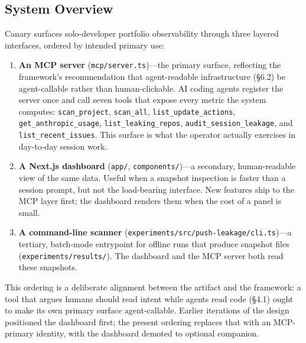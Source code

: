 \documentclass[sigconf, nonacm, anonymous=false]{acmart}
\begin{document}
\subsection{System Overview}

Canary surfaces solo-developer portfolio observability through three layered interfaces, ordered by intended primary use:

\begin{enumerate}
  \item \textbf{An MCP server} (\texttt{mcp/server.ts})---the primary surface, reflecting the framework's recommendation that agent-readable infrastructure (\S6.2) be agent-callable rather than human-clickable. AI coding agents register the server once and call seven tools that expose every metric the system computes: \texttt{scan\_project}, \texttt{scan\_all}, \texttt{list\_update\_actions}, \texttt{get\_anthropic\_usage}, \texttt{list\_leaking\_repos}, \texttt{audit\_session\_leakage}, and \texttt{list\_recent\_issues}. This surface is what the operator actually exercises in day-to-day session work.
  \item \textbf{A Next.js dashboard} (\texttt{app/}, \texttt{components/})---a secondary, human-readable view of the same data. Useful when a snapshot inspection is faster than a session prompt, but not the load-bearing interface. New features ship to the MCP layer first; the dashboard renders them when the cost of a panel is small.
  \item \textbf{A command-line scanner} (\texttt{experiments/src/push-leakage/cli.ts})---a tertiary, batch-mode entrypoint for offline runs that produce snapshot files (\texttt{experiments/results/}). The dashboard and the MCP server both read these snapshots.
\end{enumerate}

This ordering is a deliberate alignment between the artifact and the framework: a tool that argues humans should read intent while agents read code (\S4.1) ought to make its own primary surface agent-callable. Earlier iterations of the design positioned the dashboard first; the present ordering replaces that with an MCP-primary identity, with the dashboard demoted to optional companion.
\end{document}
